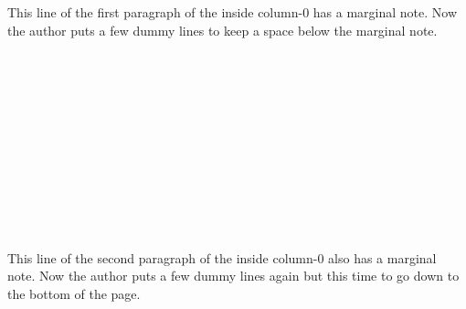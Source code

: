 
\par\Hrule
\begin{paracol}{2}
\switchcolumn
{}
\switchcolumn
This line of the first
paragraph of the inside column-0 has a marginal note.  Now the author puts
a few dummy lines to keep a space below the marginal note.\\
\Dotfill\\ \Dotfill\\ \Dotfill\\ \Dotfill\\ \Dotfill\\ \Dotfill\\
\Dotfill\\ \Dotfill\\ \Dotfill\\ \Dotfill\\ \Dotfill\\ \Dotfill\par

This line of the second
paragraph of the inside column-0 also has a marginal note.  Now the author
puts a few dummy lines again but this time to go down to the bottom of the
page.\\
\Dotfill\\ \Dotfill\\ \Dotfill\\ \Dotfill\\ \Dotfill\\ \Dotfill\\
\Dotfill\\ \Dotfill\\ \Dotfill\\ \Dotfill\\ \Dotfill\\ \Dotfill\\
\Dotfill\\ \Dotfill\par


\end{paracol}
